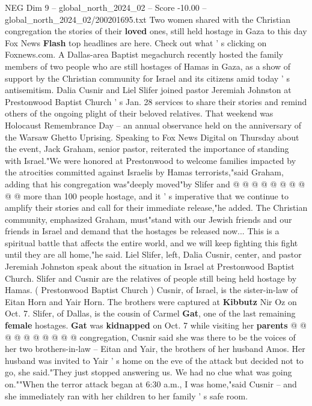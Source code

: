 \begin{textsample}{NEG Dim 9 – global\_north\_2024\_02 – Score -10.00 – global\_north\_2024\_02/200201695.txt}  \label{ex:f9_neg_281}
Two women shared with the Christian congregation the stories of their \textbf{loved} ones, still held hostage in Gaza to this day Fox News \textbf{Flash} top headlines are here.
Check out what ' s clicking on Foxnews.com.
A Dallas-area Baptist megachurch recently hosted the family members of two people who are still hostages of Hamas in Gaza, as a show of support by the Christian community for Israel and its citizens amid today ' s antisemitism.
Dalia Cusnir and Liel Slifer joined pastor Jeremiah Johnston at Prestonwood Baptist Church ' s Jan. 28 services to share their stories and remind others of the ongoing plight of their beloved relatives.
That weekend was Holocaust Remembrance Day -- an annual observance held on the anniversary of the Warsaw Ghetto Uprising.
Speaking to Fox News Digital on Thursday about the event, Jack Graham, senior pastor, reiterated the importance of standing with Israel."We were honored at Prestonwood to welcome families impacted by the atrocities committed against Israelis by Hamas terrorists,"said Graham, adding that his congregation was"deeply moved"by Slifer and @ @ @ @ @ @ @ @ @ @ more than 100 people hostage, and it ' s imperative that we continue to amplify their stories and call for their immediate release,"he added.
The Christian community, emphasized Graham, must"stand with our Jewish friends and our friends in Israel and demand that the hostages be released now...
This is a spiritual battle that affects the entire world, and we will keep fighting this fight until they are all home,"he said.
Liel Slifer, left, Dalia Cusnir, center, and pastor Jeremiah Johnston speak about the situation in Israel at Prestonwood Baptist Church.
Slifer and Cusnir are the relatives of people still being held hostage by Hamas. ( Prestonwood Baptist Church ) Cusnir, of Israel, is the sister-in-law of Eitan Horn and Yair Horn.
The brothers were captured at \textbf{Kibbutz} Nir Oz on Oct. 7.
Slifer, of Dallas, is the cousin of Carmel \textbf{Gat}, one of the last remaining \textbf{female} hostages. \textbf{Gat} was \textbf{kidnapped} on Oct. 7 while visiting her \textbf{parents} @ @ @ @ @ @ @ @ @ @ congregation, Cusnir said she was there to be the voices of her two brothers-in-law -- Eitan and Yair, the brothers of her husband Amos.
Her husband was invited to Yair ' s home on the eve of the attack but decided not to go, she said."They just stopped answering us.
We had no clue what was going on.""When the terror attack began at 6:30 a.m., I was home,"said Cusnir -- and she immediately ran with her children to her family ' s safe room.

\end{textsample}
